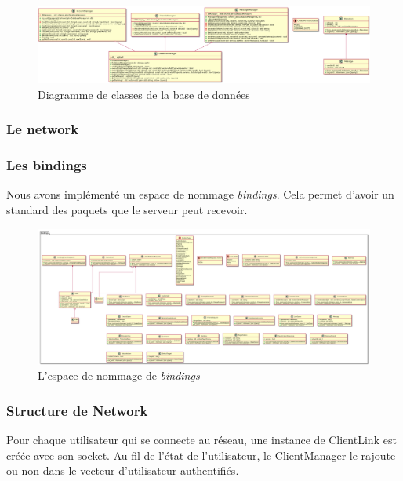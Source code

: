 \documentclass{article}
\begin{document}
\begin{figure}[!ht]
	\centering
	 \includegraphics[scale=0.2]{../res/uml/class/DatabaseClass.png}
	 \caption{Diagramme de classes de la base de données}
	 \label{fig:DatabaseDiagram}
\end{figure}

\subsubsection{Le network}

\subsubsection*{Les bindings}

Nous avons implémenté un espace de nommage \textit{bindings}. Cela permet d'avoir un standard des paquets que le serveur peut recevoir.

\begin{figure}[H]
	\centering
	 \includegraphics[scale=0.1, angle=90]{../res/uml/class/BindingClass.png}
	 \caption{L'espace de nommage de \textit{bindings}}
	 \label{fig:BindingDiagram}
\end{figure}

\subsubsection*{Structure de Network}

Pour chaque utilisateur qui se connecte au réseau, une instance de ClientLink est créée avec son socket. Au fil de l'état de l'utilisateur, le ClientManager le rajoute ou non dans le vecteur d'utilisateur authentifiés. 
\end{document}
